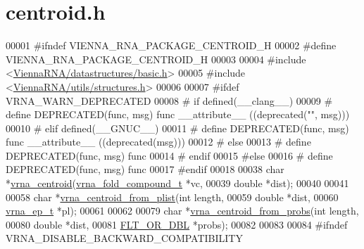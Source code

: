 \hypertarget{centroid_8h_source}{}\section{centroid.\+h}
\label{centroid_8h_source}

\begin{DoxyCode}
00001 \textcolor{preprocessor}{#ifndef VIENNA\_RNA\_PACKAGE\_CENTROID\_H}
00002 \textcolor{preprocessor}{#define VIENNA\_RNA\_PACKAGE\_CENTROID\_H}
00003 
00004 \textcolor{preprocessor}{#include <\hyperlink{datastructures_2basic_8h}{ViennaRNA/datastructures/basic.h}>}
00005 \textcolor{preprocessor}{#include <\hyperlink{utils_2structures_8h}{ViennaRNA/utils/structures.h}>}
00006 
00007 \textcolor{preprocessor}{#ifdef VRNA\_WARN\_DEPRECATED}
00008 \textcolor{preprocessor}{# if defined(\_\_clang\_\_)}
00009 \textcolor{preprocessor}{#  define DEPRECATED(func, msg) func \_\_attribute\_\_ ((deprecated("", msg)))}
00010 \textcolor{preprocessor}{# elif defined(\_\_GNUC\_\_)}
00011 \textcolor{preprocessor}{#  define DEPRECATED(func, msg) func \_\_attribute\_\_ ((deprecated(msg)))}
00012 \textcolor{preprocessor}{# else}
00013 \textcolor{preprocessor}{#  define DEPRECATED(func, msg) func}
00014 \textcolor{preprocessor}{# endif}
00015 \textcolor{preprocessor}{#else}
00016 \textcolor{preprocessor}{# define DEPRECATED(func, msg) func}
00017 \textcolor{preprocessor}{#endif}
00018 
00038 \textcolor{keywordtype}{char} *\hyperlink{group__centroid__fold_ga0e64bb67e51963dc71cbd4d30b80a018}{vrna\_centroid}(\hyperlink{group__fold__compound_structvrna__fc__s}{vrna\_fold\_compound\_t}  *vc,
00039                     \textcolor{keywordtype}{double}                *dist);
00040 
00041 
00058 \textcolor{keywordtype}{char} *\hyperlink{group__centroid__fold_ga13881673a0b214d42a59140ef5764dbb}{vrna\_centroid\_from\_plist}(\textcolor{keywordtype}{int}        length,
00059                                \textcolor{keywordtype}{double}     *dist,
00060                                \hyperlink{group__struct__utils__plist_structvrna__elem__prob__s}{vrna\_ep\_t}  *pl);
00061 
00062 
00079 \textcolor{keywordtype}{char} *\hyperlink{group__centroid__fold_ga98193ede06778a9ea966cc8fc43d0804}{vrna\_centroid\_from\_probs}(\textcolor{keywordtype}{int}        length,
00080                                \textcolor{keywordtype}{double}     *dist,
00081                                \hyperlink{group__data__structures_ga31125aeace516926bf7f251f759b6126}{FLT\_OR\_DBL} *probs);
00082 
00083 
00084 \textcolor{preprocessor}{#ifndef VRNA\_DISABLE\_BACKWARD\_COMPATIBILITY}

\end{DoxyCode}
